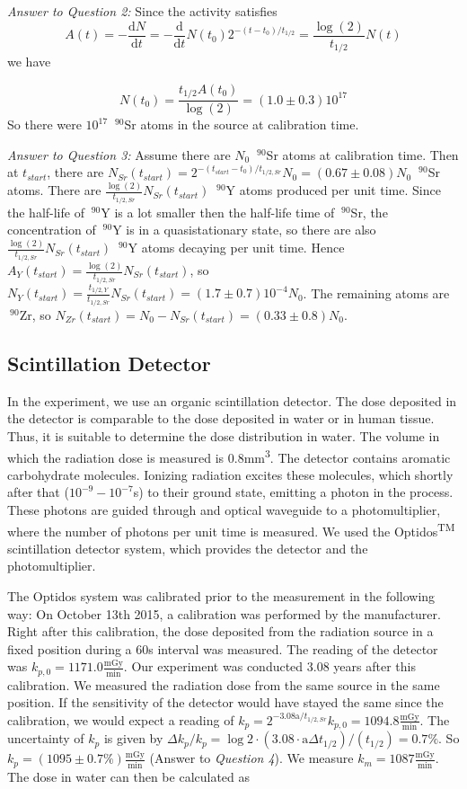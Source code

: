 \documentclass[a4paper,parskip]{scrartcl}
\begin{document}
\textit{Answer to Question 2:} Since the activity satisfies 
$$A(t) = -\frac{\mathrm{d}N}{\mathrm{d}t} = -\frac{\mathrm{d}}{\mathrm{d}t}N(t_0)2^{-(t-t_{0})/t_{1/2}} = \frac{\log(2)}{t_{1/2}}N(t)$$
we have

$$N(t_0) = \frac{t_{1/2}A(t_0)}{\log(2)} = (1.0 \pm 0.3)10^{17}$$
So there were $10^{17}$ $~^{90}$Sr atoms in the source at calibration time.

\textit{Answer to Question 3:} Assume there are $N_0$ $~^{90}$Sr atoms at calibration time. Then at $t_{start}$, there are $N_{Sr}(t_{start}) = 2^{-(t_{start}-t_{0})/t_{1/2,Sr}}N_0 = (0.67 \pm 0.08)N_0$ $~^{90}$Sr atoms. There are $\frac{\log(2)}{t_{1/2,Sr}}N_{Sr}(t_{start})$ $~^{90}$Y atoms produced per unit time. Since the half-life of $~^{90}$Y is a lot smaller then the half-life time of $~^{90}$Sr, the concentration of $~^{90}$Y is in a quasistationary state, so there are also $\frac{\log(2)}{t_{1/2,Sr}}N_{Sr}(t_{start})$ $~^{90}$Y atoms decaying per unit time. Hence $A_{Y}(t_{start}) = \frac{\log(2)}{t_{1/2,Sr}}N_{Sr}(t_{start})$, so $N_Y(t_{start})=\frac{t_{1/2,Y}}{t_{1/2,Sr}}N_{Sr}(t_{start}) = (1.7 \pm 0.7)10^{-4}N_0$. The remaining atoms are $~^{90}$Zr, so $N_{Zr}(t_{start})=N_0-N_{Sr}(t_{start})=(0.33 \pm 0.8)N_0$.

\subsection{Scintillation Detector}
In the experiment, we use an organic scintillation detector. The dose deposited in the detector is comparable to the dose deposited in water or in human tissue. Thus, it is suitable to determine the dose distribution in water. The volume in which the radiation dose is measured is 0.8mm\textsuperscript{3}. The detector contains aromatic carbohydrate molecules. Ionizing radiation excites these molecules, which shortly after that ($10^{-9}-10^{-7}$s) to their ground state, emitting a photon in the process. These photons are guided through and optical waveguide to a photomultiplier, where the number of photons per unit time is measured. We used the Optidos\textsuperscript{TM} scintillation detector system, which provides the detector and the photomultiplier.    

The Optidos system was calibrated prior to the measurement in the following way: On October 13th 2015, a calibration was performed by the manufacturer. Right after this calibration, the dose deposited from the radiation source in a fixed position during a 60s interval was measured. The reading of the detector was $k_{p,0}=1171.0\frac{\mathrm{mGy}}{\mathrm{min}}$. Our experiment was conducted $3.08$ years after this calibration. We measured the radiation dose from the same source in the same position. If the sensitivity of the detector would have stayed the same since the calibration, we would expect a reading of $k_p = 2^{-3.08\mathrm{a}/t_{1/2,Sr}}k_{p,0}=1094.8\frac{\mathrm{mGy}}{\mathrm{min}}$. The uncertainty of $k_p$ is given by $\Delta k_p/k_p = \log 2 \cdot (3.08 \cdot \mathrm{a} \Delta t_{1/2})/(t_{1/2}) = 0.7\%$. So $k_p = (1095 \pm 0.7\%)\frac{\mathrm{mGy}}{\mathrm{min}}$ (Answer to \textit{Question 4}). We measure $k_m = 1087\frac{\mathrm{mGy}}{\mathrm{min}}$. The dose in water can then be calculated as 
\end{document}
